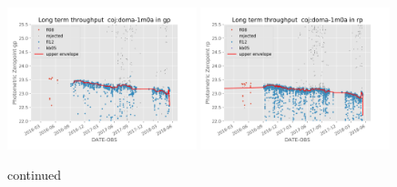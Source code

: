 \documentclass[]{spie}
\begin{document}
\begin{figure}
\includegraphics[width=0.49\textwidth]{images/photzptrend-coj-doma-1m0a-gp.png} \hspace*{\fill}
\includegraphics[width=0.49\textwidth]{images/photzptrend-coj-doma-1m0a-rp.png} \\[1ex]
\caption {continued}
\end{figure}
\end{document}
